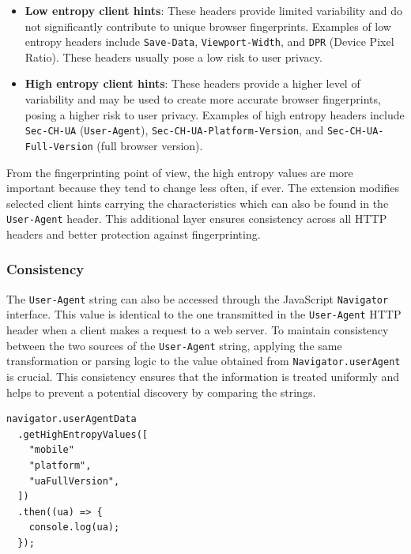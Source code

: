 \begin{itemize}
	\item \textbf{Low entropy client hints}: These headers provide limited variability and do not significantly contribute to unique browser fingerprints. Examples of low entropy headers include \texttt{Save-Data}, \texttt{Viewport-Width}, and \texttt{DPR} (Device Pixel Ratio). These headers usually pose a low risk to user privacy.
	\item \textbf{High entropy client hints}: These headers provide a higher level of variability and may be used to create more accurate browser fingerprints, posing a higher risk to user privacy. Examples of high entropy headers include \texttt{Sec-CH-UA} (\texttt{User-Agent}), \texttt{Sec-CH-UA-Platform-Version}, and \texttt{Sec-CH-UA-Full-Version} (full browser version).
\end{itemize}

From the fingerprinting point of view, the high entropy values are more important because they tend to change less often, if ever. The extension modifies selected client hints carrying the characteristics which can also be found in the \texttt{User-Agent} header. This additional layer ensures consistency across all HTTP headers and better protection against fingerprinting.

\subsubsection{Consistency}

The \texttt{User-Agent} string can also be accessed through the JavaScript \texttt{Navigator} interface. This value is identical to the one transmitted in the \texttt{User-Agent} HTTP header when a client makes a request to a web server. To maintain consistency between the two sources of the \texttt{User-Agent} string, applying the same transformation or parsing logic to the value obtained from \texttt{Navigator.userAgent} is crucial. This consistency ensures that the information is treated uniformly and helps to prevent a potential discovery by comparing the strings.

\bigbreak

\begin{lstlisting}[caption={An example the User-Agent Client Hints API usage \cite{MDN}. This API call returns the same values as the HTTP client hints in example \ref{Listing:HTTPClientHintsExample}.}]
navigator.userAgentData
  .getHighEntropyValues([
  	"mobile"
    "platform",
    "uaFullVersion",
  ])
  .then((ua) => {
    console.log(ua);
  });	
\end{lstlisting}


